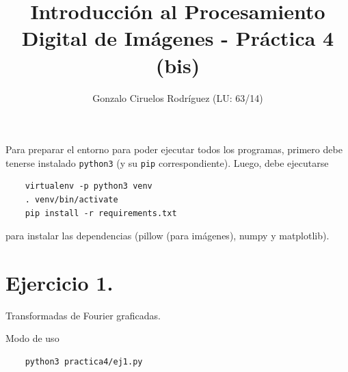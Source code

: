 \documentclass[11pt, spanish]{article}
\title{Introducción al Procesamiento Digital de Imágenes - Práctica 4 (bis)}
\date{}
\author{Gonzalo Ciruelos Rodríguez (LU: 63/14)}
\begin{document}
\maketitle

Para preparar el entorno para poder ejecutar todos los programas,
primero debe tenerse instalado \texttt{python3} (y su \texttt{pip} correspondiente).
Luego, debe ejecutarse 
\begin{verbatim}
    virtualenv -p python3 venv 
    . venv/bin/activate
    pip install -r requirements.txt 
\end{verbatim}

\noindent para instalar las dependencias (pillow (para imágenes), numpy y matplotlib).



\section{Ejercicio 1.}

Transformadas de Fourier graficadas.

Modo de uso
\begin{verbatim}
    python3 practica4/ej1.py
\end{verbatim}
\end{document}
